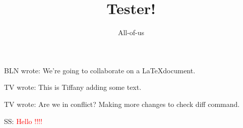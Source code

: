 \documentclass[12pt]{article}
\title{Tester!}
\author{All-of-us}
\newcommand{\bln}[1]{BLN wrote: \textcolor{red!70!blue!70}{#1}}
\newcommand{\tv}[1]{TV wrote: \textcolor{blue!70}{#1}}
\newcommand{\ss}[1]{SS: \textcolor{red}{#1}}
\begin{document}
\maketitle

\bln{We're going to collaborate on a \LaTeX document.}

\tv{This is Tiffany adding some text.}

\tv{Are we in conflict? Making more changes to check diff command.}

\ss{Hello !!!!}
\end{document}
